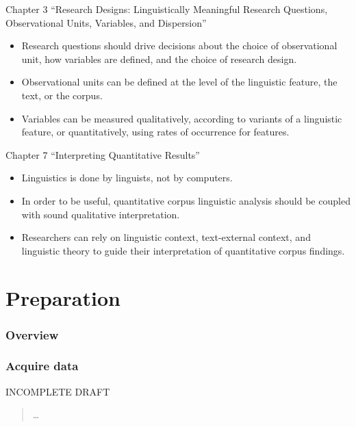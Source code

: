 \documentclass[
]{article}
\providecommand{\tightlist}{%
  \setlength{\itemsep}{0pt}\setlength{\parskip}{0pt}}
\begin{document}
Chapter 3 ``Research Designs: Linguistically Meaningful Research Questions, Observational Units, Variables, and Dispersion''

\begin{itemize}
\tightlist
\item
  Research questions should drive decisions about the choice of observational unit, how variables are defined, and the choice of research design.
\item
  Observational units can be defined at the level of the linguistic feature,
  the text, or the corpus.
\item
  Variables can be measured qualitatively, according to variants of a
  linguistic feature, or quantitatively, using rates of occurrence for features.
\end{itemize}

Chapter 7 ``Interpreting Quantitative Results''

\begin{itemize}
\tightlist
\item
  Linguistics is done by linguists, not by computers.
\item
  In order to be useful, quantitative corpus linguistic analysis should be
  coupled with sound qualitative interpretation.
\item
  Researchers can rely on linguistic context, text-external context, and
  linguistic theory to guide their interpretation of quantitative corpus findings.
\end{itemize}

\hypertarget{part-preparation}{%
\part{Preparation}\label{part-preparation}}

\hypertarget{preparation-overview}{%
\section*{Overview}\label{preparation-overview}}

\hypertarget{acquire-data}{%
\section{Acquire data}\label{acquire-data}}

INCOMPLETE DRAFT

\begin{quote}
\ldots{}
\end{quote}
\end{document}
